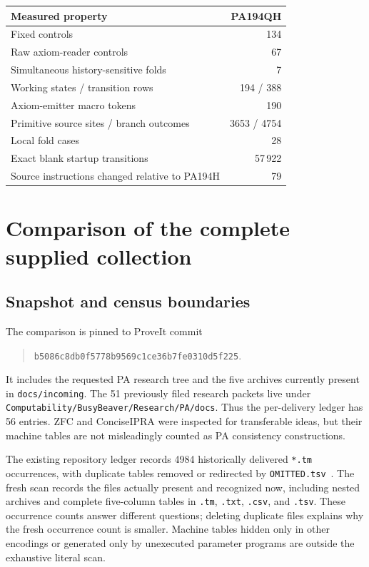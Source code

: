 \documentclass[11pt,letterpaper]{article}
\newcommand{\file}[1]{\texttt{\nolinkurl{#1}}}
\newcommand{\snapshot}{\texttt{b5086c8db0f5778b9569c1ce36b7fe0310d5f225}}
\begin{document}
\begin{center}\small
\begin{tabular}{@{}lr@{}}
\toprule
Measured property & PA194QH \\
\midrule
Fixed controls & 134 \\
Raw axiom-reader controls & 67 \\
Simultaneous history-sensitive folds & 7 \\
Working states / transition rows & 194 / 388 \\
Axiom-emitter macro tokens & 190 \\
Primitive source sites / branch outcomes & 3653 / 4754 \\
Local fold cases & 28 \\
Exact blank startup transitions & 57\,922 \\
Source instructions changed relative to PA194H & 79 \\
\bottomrule
\end{tabular}
\end{center}

\section{Comparison of the complete supplied collection}
\label{sec:comparison}

\subsection{Snapshot and census boundaries}
The comparison is pinned to ProveIt commit
\begin{quote}\small\snapshot.\end{quote}
It includes the requested PA research tree and the five archives currently
present in \file{docs/incoming}. The 51 previously filed research packets
live under \file{Computability/BusyBeaver/Research/PA/docs}. Thus the
per-delivery ledger has 56 entries. ZFC and ConciseIPRA were inspected for
transferable ideas, but their machine tables are not misleadingly counted
as PA consistency constructions.

The existing repository ledger records 4984 historically delivered
\file{*.tm} occurrences, with duplicate tables removed or redirected by
\file{OMITTED.tsv}~\cite{machine-ledger}. The fresh scan records the
files actually present and recognized now, including nested archives and
complete five-column tables in \file{.tm}, \file{.txt}, \file{.csv}, and
\file{.tsv}. These occurrence counts answer different questions; deleting
duplicate files explains why the fresh occurrence count is smaller.
Machine tables hidden only in other encodings or generated only by
unexecuted parameter programs are outside the exhaustive literal scan.
\end{document}
